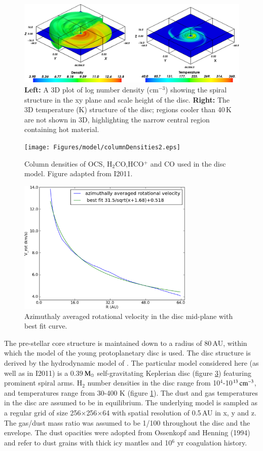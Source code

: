\documentclass[useAMS,usenatbib]{mn2e}
\begin{document}
\begin{figure}
 \includegraphics[width=168mm]{Figures/model/rhoT6.eps}
 \caption{{\bf Left:} A 3D plot of log number density (cm$^{-3}$) showing the spiral structure in the xy plane and scale height of the disc. {\bf Right:} The 3D temperature (K) structure of the disc; regions cooler than 40$\,$K are not shown in 3D, highlighting the narrow central region containing hot material.}
 \label{rhoT} 
\end{figure}

\begin{figure}
 \texttt{[image: Figures/model/columnDensities2.eps]}
 \caption{Column densities of OCS, H$_2$CO,HCO$^+$ and CO used in the disc model. Figure adapted from I2011.}
 \label{Chemistry} 
\end{figure}

\begin{figure}
 \includegraphics[width=84mm]{Figures/model/rotational_velocities.eps}
 \caption{Azimuthaly averaged rotational velocity in the disc mid-plane with best fit curve.}
 \label{velocity}
\end{figure}


The pre-stellar core structure is maintained down to a radius of 80\,AU, within which the model of the young protoplanetary disc is used. The disc structure is derived by the hydrodynamic model of \citet{Boley2007,Boley2009}. The particular model considered here (as well as in I2011) is a 0.39$\,\rm{M}_\odot$ self-gravitating Keplerian disc (figure \ref{velocity}) featuring prominent spiral arms. H$_2$ number densities in the disc range from 10$^{4}$-10$^{13}\,\rm{cm}^{-3}$, and temperatures range from 30-400 K (figure \ref{rhoT}). The dust and gas temperatures in the disc are assumed to be in equilibrium. The underlying model is sampled as a regular grid of size 256$\times$256$\times$64 with spatial resolution of 0.5$\,$AU in x, y and z. The gas/dust mass ratio was assumed to be 1/100 throughout the disc and the envelope. The dust opacities were adopted from Ossenkopf and Henning (1994) and refer to dust grains with thick icy mantles and 10$^6$ yr coagulation history.\newline
\end{document}
